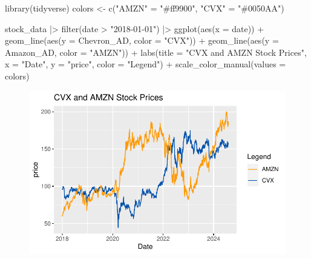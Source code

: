 \documentclass[
  letterpaper,
  DIV=11,
  numbers=noendperiod]{scrartcl}
\newenvironment{Shaded}{\begin{snugshade}}{\end{snugshade}}
\newcommand{\AttributeTok}[1]{\textcolor[rgb]{0.40,0.45,0.13}{#1}}
\newcommand{\FunctionTok}[1]{\textcolor[rgb]{0.28,0.35,0.67}{#1}}
\newcommand{\NormalTok}[1]{\textcolor[rgb]{0.00,0.23,0.31}{#1}}
\newcommand{\OtherTok}[1]{\textcolor[rgb]{0.00,0.23,0.31}{#1}}
\newcommand{\SpecialCharTok}[1]{\textcolor[rgb]{0.37,0.37,0.37}{#1}}
\newcommand{\StringTok}[1]{\textcolor[rgb]{0.13,0.47,0.30}{#1}}
\begin{document}
\begin{Shaded}
\begin{Highlighting}[]
\FunctionTok{library}\NormalTok{(tidyverse)}
\NormalTok{colors }\OtherTok{\textless{}{-}} \FunctionTok{c}\NormalTok{(}\StringTok{"AMZN"} \OtherTok{=} \StringTok{"\#ff9900"}\NormalTok{, }\StringTok{"CVX"} \OtherTok{=} \StringTok{"\#0050AA"}\NormalTok{)}

\NormalTok{stock\_data }\SpecialCharTok{|\textgreater{}}
  \FunctionTok{filter}\NormalTok{(date }\SpecialCharTok{\textgreater{}} \StringTok{"2018{-}01{-}01"}\NormalTok{) }\SpecialCharTok{|\textgreater{}} 
  \FunctionTok{ggplot}\NormalTok{(}\FunctionTok{aes}\NormalTok{(}\AttributeTok{x =}\NormalTok{ date)) }\SpecialCharTok{+}
  \FunctionTok{geom\_line}\NormalTok{(}\FunctionTok{aes}\NormalTok{(}\AttributeTok{y =}\NormalTok{ Chevron\_AD, }\AttributeTok{color =} \StringTok{"CVX"}\NormalTok{)) }\SpecialCharTok{+}
  \FunctionTok{geom\_line}\NormalTok{(}\FunctionTok{aes}\NormalTok{(}\AttributeTok{y =}\NormalTok{ Amazon\_AD, }\AttributeTok{color =} \StringTok{"AMZN"}\NormalTok{)) }\SpecialCharTok{+}
  \FunctionTok{labs}\NormalTok{(}\AttributeTok{title =} \StringTok{"CVX and AMZN Stock Prices"}\NormalTok{, }\AttributeTok{x =} \StringTok{"Date"}\NormalTok{, }\AttributeTok{y =} \StringTok{"price"}\NormalTok{, }
       \AttributeTok{color =} \StringTok{"Legend"}\NormalTok{) }\SpecialCharTok{+}
  \FunctionTok{scale\_color\_manual}\NormalTok{(}\AttributeTok{values =}\NormalTok{ colors)}
\end{Highlighting}
\end{Shaded}

\begin{figure}[H]

{\centering \includegraphics{homework_1_files/figure-pdf/unnamed-chunk-13-1.pdf}

}

\end{figure}
\end{document}
